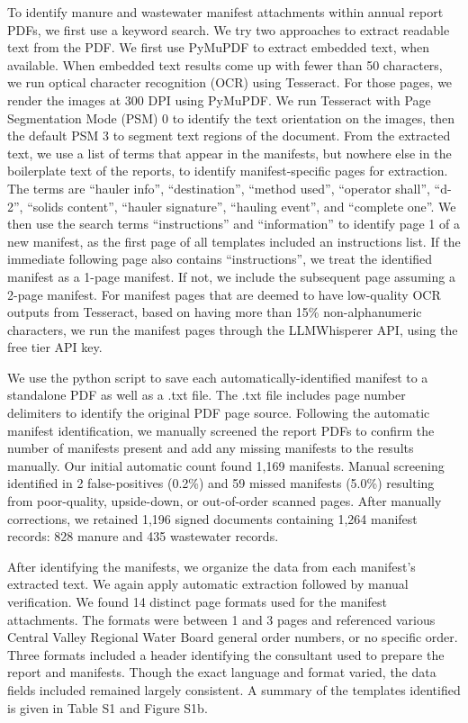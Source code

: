 \documentclass{iopjournal}
\begin{document}
To identify manure and wastewater manifest attachments within annual report PDFs, we first use a keyword search. We try two approaches to extract readable text from the PDF. We first use PyMuPDF to extract embedded text, when available. When embedded text results come up with fewer than 50 characters, we run optical character recognition (OCR) using Tesseract. For those pages, we render the images at 300 DPI using PyMuPDF. We run Tesseract with Page Segmentation Mode (PSM) 0 to identify the text orientation on the images, then the default PSM 3 to segment text regions of the document. From the extracted text, we use a list of terms that appear in the manifests, but nowhere else in the boilerplate text of the reports, to identify manifest-specific pages for extraction. The terms are ``hauler info'', ``destination'', ``method used'', ``operator shall'', ``d-2'',  ``solids content'', ``hauler signature'', ``hauling event'', and ``complete one''. We then use the search terms ``instructions'' and ``information'' to identify page 1 of a new manifest, as the first page of all templates included an instructions list. If the immediate following page also contains ``instructions'', we treat the identified manifest as a 1-page manifest. If not, we include the subsequent page assuming a 2-page manifest. For manifest pages that are deemed to have low-quality OCR outputs from Tesseract, based on having more than 15\% non-alphanumeric characters, we run the manifest pages through the LLMWhisperer API, using the free tier API key.

We use the python script to save each automatically-identified manifest to a standalone PDF as well as a .txt file. The .txt file includes page number delimiters to identify the original PDF page source. Following the automatic manifest identification, we manually screened the report PDFs to confirm the number of manifests present and add any missing manifests to the results manually. Our initial automatic count found 1,169 manifests. Manual screening identified in 2 false-positives (0.2\%) and 59 missed manifests (5.0\%) resulting from poor-quality, upside-down, or out-of-order scanned pages. After manually corrections, we retained 1,196 signed documents containing 1,264 manifest records: 828 manure and 435 wastewater records.

After identifying the manifests, we organize the data from each manifest’s extracted text. We again apply automatic extraction followed by manual verification. We found 14 distinct page formats used for the manifest attachments. The formats were between 1 and 3 pages and referenced various Central Valley Regional Water Board general order numbers, or no specific order. Three formats included a header identifying the consultant used to prepare the report and manifests. Though the exact language and format varied, the data fields included remained largely consistent. A summary of the templates identified is given in Table S1 and Figure S1b.
\end{document}
